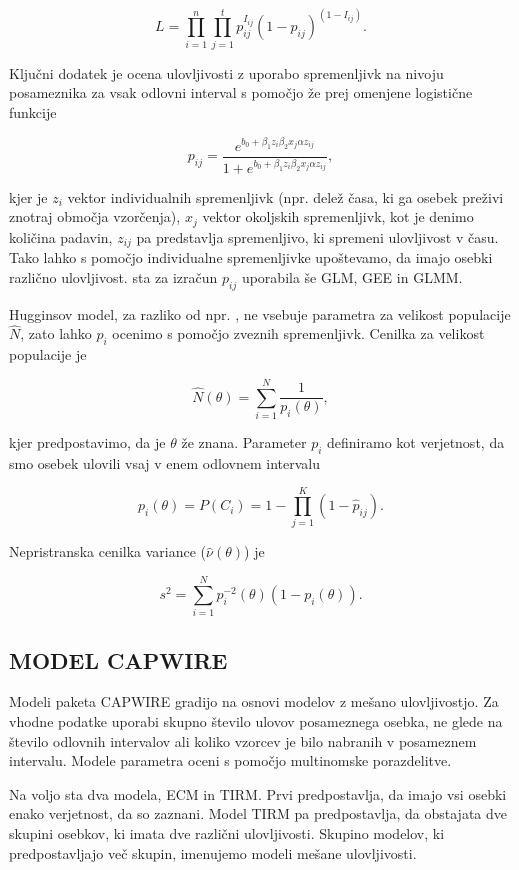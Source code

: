 \[
L = \prod_{i=1}^{n} \prod_{j=1}^{t} p_{ij}^{I_{ij}} (1 - p_{ij})^{(1 - {I_{ij}})}.
\]

Ključni dodatek je ocena ulovljivosti z uporabo spremenljivk na nivoju posameznika za vsak odlovni interval s pomočjo že prej omenjene logistične funkcije

\[
p_{ij} = \frac{e^{b_0 + \beta_1 z_i \beta_2 x_j \alpha z_{ij}}}{1 + e^{b_0 + \beta_1 z_i \beta_2 x_j \alpha z_{ij}}},
\]

kjer je $z_i$ vektor individualnih spremenljivk (npr. delež časa, ki ga osebek preživi znotraj območja vzorčenja), $x_j$ vektor okoljskih spremenljivk, kot je denimo količina padavin, $z_{ij}$ pa predstavlja spremenljivo, ki spremeni ulovljivost v času. Tako lahko s pomočjo individualne spremenljivke upoštevamo, da imajo osebki različno ulovljivost. \citet{akanda_estimation_2014} sta za izračun $p_{ij}$ uporabila še GLM, GEE in GLMM.

Hugginsov model, za razliko od npr. \citet{pollock_use_1984}, ne vsebuje parametra za velikost populacije $\hat{N}$, zato lahko $p_i$ ocenimo s pomočjo zveznih spremenljivk. Cenilka za velikost populacije je

\[
\hat{N}(\theta) = \sum_{i=1}^{N} \frac{1}{p_{i}(\theta)},
\]

kjer predpostavimo, da je $\theta$ že znana. Parameter $p_i$ definiramo kot verjetnost, da smo osebek ulovili vsaj v enem odlovnem intervalu

\[
p_i(\theta) = P(C_i) = 1 - \prod_{j=1}^{K}(1-\hat{p}_{ij}).
\]

Nepristranska cenilka variance ($\hat{\nu}(\theta)$) je

\[
s^2 = \sum_{i=1}^{N} p_{i}^{-2} (\theta)(1-p_i (\theta)).
\]

\subsection{MODEL CAPWIRE}
Modeli paketa CAPWIRE \citep{miller_new_2005} gradijo na osnovi modelov z mešano ulovljivostjo. Za vhodne podatke uporabi skupno število ulovov posameznega osebka, ne glede na število odlovnih intervalov ali koliko vzorcev je bilo nabranih v posameznem intervalu. Modele parametra oceni s pomočjo multinomske porazdelitve.

Na voljo sta dva modela, ECM in TIRM. Prvi predpostavlja, da imajo vsi osebki enako verjetnost, da so zaznani. Model TIRM pa predpostavlja, da obstajata dve skupini osebkov, ki imata dve različni ulovljivosti. Skupino modelov, ki predpostavljajo več skupin, imenujemo modeli mešane ulovljivosti.

